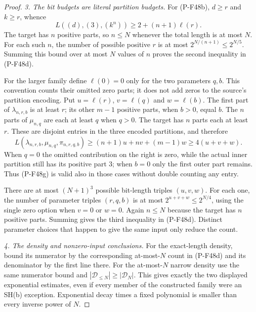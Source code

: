 \begin{proof}
\emph{3. The bit budgets are literal partition budgets.}
For (P-F48b), $d\ge r$ and $k\ge r$, whence
\[
             L((d),(3),(k^n))
                      \ge 2+(n+1)\ell(r).
 \tag{P-F48f}
\]
The target has $n$ positive parts, so $n\le N$ whenever
the total length is at most $N$. For each such $n$,
the number of possible positive $r$ is at most
$2^{N/(n+1)}\le2^{N/5}$.
Summing this bound over at most $N$ values of $n$
proves the second inequality in (P-F48d).

For the larger family define $\ell(0)=0$ only for the
two parameters $q,b$. This convention counts their
omitted zero parts; it does not add zeros to the source's
partition encoding. Put
$u=\ell(r)$, $v=\ell(q)$ and $w=\ell(b)$.
The first part of $\lambda_{n,r,b}$ is at least $r$;
its other $m-1$ positive parts, when $b>0$, equal $b$.
The $n$ parts of $\mu_{n,q}$ are each at least $q$
when $q>0$. The target has $n$ parts each at least $r$.
These are disjoint entries in the three encoded
partitions, and therefore
\[
              L(\lambda_{n,r,b},\mu_{n,q},\pi_{n,r,q,b})
                   \ge (n+1)u+nv+(m-1)w
                   \ge4(u+v+w).
 \tag{P-F48g}
\]
When $q=0$ the omitted contribution on the right is
zero, while the actual inner partition still has its
positive part $3$; when $b=0$ only the first outer
part remains. Thus (P-F48g) is valid also in those
cases without double counting any entry.

There are at most $(N+1)^3$ possible bit-length triples
$(u,v,w)$. For each one, the number of parameter triples
$(r,q,b)$ is at most $2^{u+v+w}\le2^{N/4}$, using the
single zero option when $v=0$ or $w=0$.
Again $n\le N$ because the target has $n$ positive
parts. Summing gives the third inequality in
(P-F48d). Distinct parameter choices that happen to
give the same input only reduce the count.

\emph{4. The density and nonzero-input conclusions.}
For the exact-length density, bound its numerator by
the corresponding at-most-$N$ count in (P-F48d) and
its denominator by the first line there.
For the at-most-$N$ narrow density use the same numerator
bound and $|\mathcal D_{\le N}|\ge|\mathcal D_N|$.
This gives exactly the two displayed exponential
estimates, even if every member of the constructed
family were an SH(b) exception. Exponential decay
times a fixed polynomial is smaller than every
inverse power of $N$.


\end{proof}
